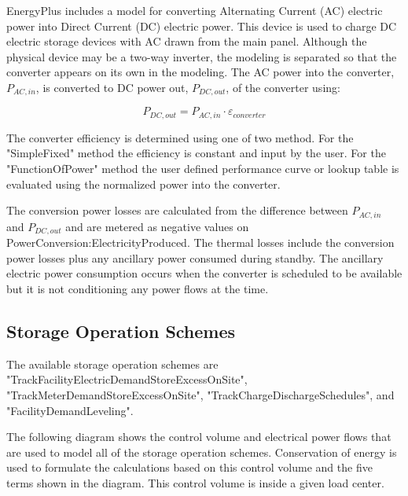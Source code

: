 EnergyPlus includes a model for converting Alternating Current (AC) electric power into Direct Current (DC) electric power.  This device is used to charge DC electric storage devices with AC drawn from the main panel.  Although the physical device may be a two-way inverter, the modeling is separated so that the converter appears on its own in the modeling. The AC power into the converter, $ {P_{AC,in}} $, is converted to DC power out, $ {P_{DC,out}} $, of the converter using: 

\begin{equation}
  {P_{DC,out}} = {P_{AC,in}} \cdot {\varepsilon_{converter}}
\end{equation}

The converter efficiency is determined using one of two method.  For the "SimpleFixed" method the efficiency is constant and input by the user.  For the "FunctionOfPower" method the user defined performance curve or lookup table is evaluated using the normalized power into the converter.

The conversion power losses are calculated from the difference between $ {P_{AC,in}} $ and $ {P_{DC,out}} $ and are metered as negative values on PowerConversion:ElectricityProduced.  The thermal losses include the conversion power losses plus any ancillary power consumed during standby.  The ancillary electric power consumption occurs when the converter is scheduled to be available but it is not conditioning any power flows at the time. 

\subsection{Storage Operation Schemes}

The available storage operation schemes are "TrackFacilityElectricDemandStoreExcessOnSite", "TrackMeterDemandStoreExcessOnSite", "TrackChargeDischargeSchedules", and "FacilityDemandLeveling".  

The following diagram shows the control volume and electrical power flows that are used to model all of the storage operation schemes.  Conservation of energy is used to formulate the calculations based on this control volume and the five terms shown in the diagram.  This control volume is inside a given load center. 

